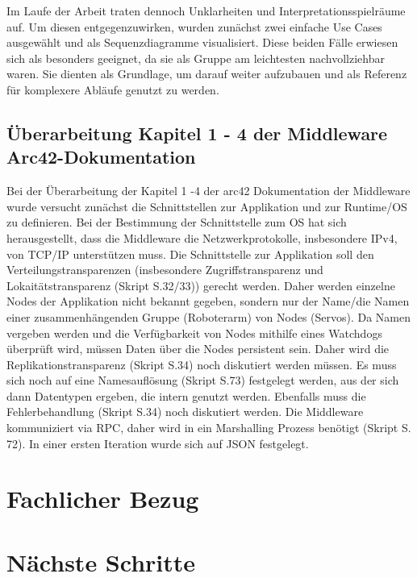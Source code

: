 \documentclass{article}
\begin{document}
Im Laufe der Arbeit traten dennoch Unklarheiten und Interpretationsspielräume auf. Um diesen entgegenzuwirken, wurden zunächst zwei einfache Use Cases ausgewählt und als Sequenzdiagramme visualisiert. Diese beiden Fälle erwiesen sich als besonders geeignet, da sie als Gruppe am leichtesten nachvollziehbar waren. Sie dienten als Grundlage, um darauf weiter aufzubauen und als Referenz für komplexere Abläufe genutzt zu werden.

	


\subsection{Überarbeitung Kapitel 1 - 4 der Middleware Arc42-Dokumentation} 
Bei der Überarbeitung der Kapitel 1 -4 der arc42 Dokumentation der Middleware wurde versucht zunächst die Schnittstellen zur Applikation und zur Runtime/OS zu definieren. Bei der Bestimmung der Schnittstelle zum OS hat sich herausgestellt, dass die Middleware die Netzwerkprotokolle, insbesondere IPv4, von TCP/IP unterstützen muss. Die Schnittstelle zur Applikation soll den Verteilungstransparenzen (insbesondere Zugriffstransparenz und Lokaitätstransparenz (Skript S.32/33)) gerecht werden. Daher werden einzelne Nodes der Applikation nicht bekannt gegeben, sondern nur der Name/die Namen einer zusammenhängenden Gruppe (Roboterarm) von Nodes (Servos). Da Namen vergeben werden und die Verfügbarkeit von Nodes mithilfe eines Watchdogs überprüft wird, müssen Daten über die Nodes persistent sein. Daher wird die Replikationstransparenz (Skript S.34) noch diskutiert werden müssen. Es muss sich noch auf eine Namesauflösung (Skript S.73) festgelegt werden, aus der sich dann Datentypen ergeben, die intern genutzt werden. Ebenfalls muss die Fehlerbehandlung (Skript S.34) noch diskutiert werden. Die Middleware kommuniziert via RPC, daher wird in ein Marshalling Prozess benötigt (Skript S. 72). In einer ersten Iteration wurde sich auf JSON festgelegt. 




\section{Fachlicher Bezug}






\clearpage


\section{Nächste Schritte}
\end{document}
